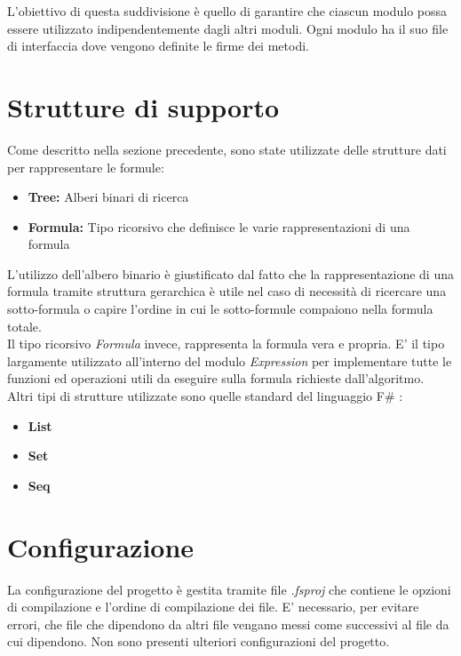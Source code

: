 \documentclass[\main/tesi.tex]{subfiles}
\begin{document}
L'obiettivo di questa suddivisione è quello di garantire che ciascun modulo possa essere utilizzato indipendentemente dagli altri moduli.
Ogni modulo ha il suo file di interfaccia dove vengono definite le firme dei metodi.

\section{Strutture di supporto}
Come descritto nella sezione precedente, sono state utilizzate delle strutture dati per rappresentare le formule:
\begin{itemize}
    \item \textbf{Tree:} Alberi binari di ricerca
    \item \textbf{Formula:} Tipo ricorsivo che definisce le varie rappresentazioni di una formula
\end{itemize}
L'utilizzo dell'albero binario è giustificato dal fatto che la rappresentazione di una formula tramite struttura gerarchica è utile nel caso di necessità di ricercare una sotto-formula o capire l'ordine in cui le sotto-formule compaiono nella formula totale. \\
Il tipo ricorsivo \textit{Formula} invece, rappresenta la formula vera e propria. E' il tipo largamente utilizzato all'interno del modulo \textit{Expression} per implementare tutte le funzioni ed operazioni utili da eseguire sulla formula richieste dall'algoritmo. \\
Altri tipi di strutture utilizzate sono quelle standard del linguaggio F\# \cite{fsharp}:
\begin{itemize}
    \item \textbf{List}
    \item \textbf{Set}
    \item \textbf{Seq}
\end{itemize}

\section{Configurazione}
La configurazione del progetto è gestita tramite file \textit{.fsproj} che contiene le opzioni di compilazione e l'ordine di compilazione dei file. E' necessario, per evitare errori, che file che dipendono da altri file vengano messi come successivi al file da cui dipendono.
Non sono presenti ulteriori configurazioni del progetto.
\end{document}
